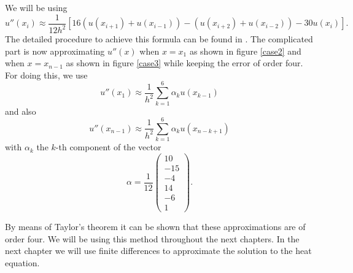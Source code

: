 \documentclass[00main.tex]{subfiles}
\begin{document}
We will be using \begin{equation}
u'' (x_i) \approx \frac{1}{12h^2} \left[ 16 ( u(x_{i+1}) + u(x_{i-1})) - (u(x_{i+2}) + u(x_{i-2})) - 30 u(x_i) \right].
\label{ec1}
\end{equation} The detailed procedure to achieve this formula can be found in \cite{burden}. The complicated part is now approximating $u''(x)$ when $x = x_1$ as shown in figure \ref{case2} and when $x = x_{n-1}$ as shown in figure \ref{case3} while keeping the error of order four. For doing this, we use
\begin{equation}
u''(x_1) \approx \frac{1}{h^2} \sum_{k=1}^6 \alpha_k u(x_{k-1})  \label{case2eq}
\end{equation} and also \begin{equation}
u'' (x_{n-1}) \approx \frac{1}{h^2} \sum_{k=1}^6 \alpha_k u(x_{n-k+1}) \label{case3eq}
\end{equation} with $\alpha_k$ the $k$-th component of the vector \[ \alpha = \frac{1}{12} \left( \begin{array}{c}
 10\\ -15\\ -4\\ 14\\ -6 \\ 1
\end{array}\right).
\]

By means of Taylor's theorem it can be shown that these approximations are of order four. We will be using this method throughout the next chapters. In the next chapter we will use finite differences to approximate the solution to the heat equation.
\end{document}
